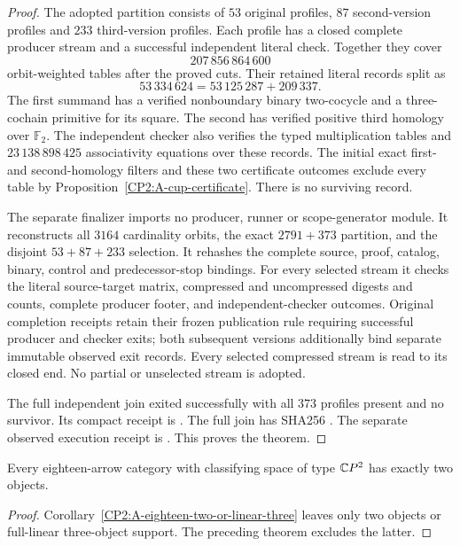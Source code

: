 \begin{proof}
The adopted partition consists of $53$ original profiles,
$87$ second-version profiles and $233$ third-version
profiles.  Each profile has a closed complete producer
stream and a successful independent literal check.
Together they cover
\[
 207\,856\,864\,600
\]
orbit-weighted tables after the proved cuts.  Their
retained literal records split as
\[
 53\,334\,624
   =53\,125\,287+209\,337.
\]
The first summand has a verified nonboundary binary
two-cocycle and a three-cochain primitive for its
square.  The second has verified positive third
homology over $\mathbb F_2$.  The independent checker
also verifies the typed multiplication tables and
$23\,138\,898\,425$ associativity equations over these
records.  The initial exact first- and second-homology
filters and these two certificate outcomes exclude
every table by Proposition~\ref{CP2:A-cup-certificate}.
There is no surviving record.

The separate finalizer
imports no producer, runner or scope-generator module.
It reconstructs all $3164$ cardinality orbits, the exact
$2791+373$ partition, and the disjoint $53+87+233$
selection.  It rehashes the complete source, proof,
catalog, binary, control and predecessor-stop bindings.
For every selected stream it checks the literal
source-target matrix, compressed and uncompressed
digests and counts, complete producer footer, and
independent-checker outcomes.  Original completion
receipts retain their frozen publication rule requiring
successful producer and checker exits; both subsequent
versions additionally bind separate immutable observed
exit records.  Every selected compressed stream is read
to its closed end.  No partial or unselected stream is
adopted.

The full independent join exited successfully with
all $373$ profiles present and no survivor.  Its compact
receipt is
.
The full join has SHA256
.
The separate observed execution receipt is
.
This proves the theorem.
\end{proof}

\begin{corollary}
\label{CP2:A-eighteen-only-two-objects}
Every eighteen-arrow category with classifying space
of type $\mathbb{C}P^2$ has exactly two objects.
\end{corollary}
\begin{proof}
Corollary~\ref{CP2:A-eighteen-two-or-linear-three}
leaves only two objects or full-linear three-object
support.  The preceding theorem excludes the latter.
\end{proof}

